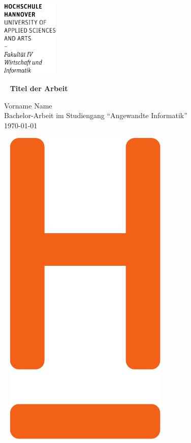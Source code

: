 \documentclass[12pt,DIV14,BCOR10mm,a4paper,twoside,parskip=half-,headsepline,headinclude]{scrreprt}
\begin{document}
  \thispagestyle{empty} %
\includegraphics[width=0.2\textwidth]{Wortmarke_WI_schwarz}

   {  ~ \sffamily
  \vfill
  {\Huge\bfseries Titel der Arbeit}
  \bigskip

  {\Large 
  Vorname Name \\[2ex]
 Bachelor-Arbeit im Studiengang "`Angewandte Informatik"' 
 \\[5ex]
   \today } 
}
 \vfill
  
  ~ \hfill
  \includegraphics[height=0.3\paperheight]{H_WI_Pantone1665} 

\vspace*{-3cm}
\end{document}
